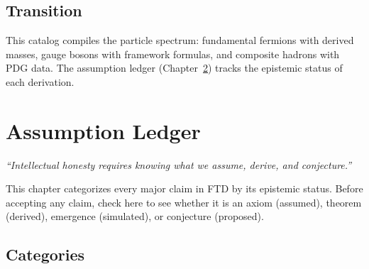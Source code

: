 \documentclass[
  11pt,
  letterpaper,
  twoside,
  openright]{book}
\begin{document}
\section{Transition}\label{transition-45}

This catalog compiles the particle spectrum: fundamental fermions with
derived masses, gauge bosons with framework formulas, and composite
hadrons with PDG data. The assumption ledger
(Chapter~\ref{sec-assumption-ledger}) tracks the epistemic status of
each derivation.

\chapter{Assumption Ledger}\label{sec-assumption-ledger}

\emph{``Intellectual honesty requires knowing what we assume, derive,
and conjecture.''}

\begin{tcolorbox}[enhanced jigsaw, coltitle=black, colbacktitle=quarto-callout-important-color!10!white, toprule=.15mm, colframe=quarto-callout-important-color-frame, arc=.35mm, opacityback=0, bottomtitle=1mm, toptitle=1mm, breakable, colback=white, titlerule=0mm, opacitybacktitle=0.6, title=\textcolor{quarto-callout-important-color}{\faExclamation}\hspace{0.5em}{Purpose of This Chapter}, rightrule=.15mm, bottomrule=.15mm, leftrule=.75mm, left=2mm]

This chapter categorizes every major claim in FTD by its epistemic
status. Before accepting any claim, check here to see whether it is an
axiom (assumed), theorem (derived), emergence (simulated), or conjecture
(proposed).

\end{tcolorbox}

\section{Categories}\label{categories}
\end{document}
